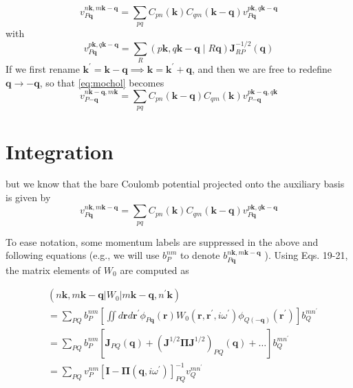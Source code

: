 \documentclass[12pt]{article}
\begin{document}
\begin{equation}
    v_{P\mathbf{q}}^{n \mathbf{k}, m \mathbf{k}-\mathbf{q}} = \sum_{pq} C_{pn}(\mathbf{k}) C_{qm}(\mathbf{k}-\mathbf{q}) v_{P\mathbf{q}}^{p\mathbf{k}, q\mathbf{k}-\mathbf{q}}
\label{eq:mochol}
\end{equation}
with
\begin{equation}
    v_{P\mathbf{q}}^{p\mathbf{k}, q\mathbf{k}-\mathbf{q}} = \sum_R (p\mathbf{k}, q\mathbf{k}-\mathbf{q} \mid R\mathbf{q}) \mathbf{J}_{RP}^{-1/2}(\mathbf{q})
\end{equation}
If we first rename $\mathbf{k^\prime} = \mathbf{k}-\mathbf{q} \implies \mathbf{k} = \mathbf{k^\prime} + \mathbf{q}$, and then we are free to redefine $\mathbf{q} \rightarrow -\mathbf{q}$, so that \ref{eq:mochol} becomes
\begin{equation}
    v_{P\mathbf{-q}}^{n \mathbf{k}-\mathbf{q}, m \mathbf{k}} = \sum_{pq} C_{pn}(\mathbf{k}-\mathbf{q}) C_{qm}(\mathbf{k}) v_{P\mathbf{-q}}^{p\mathbf{k}-\mathbf{q}, q\mathbf{k}}
\end{equation}
\section{Integration}
but we know that the bare Coulomb potential projected onto the auxiliary basis is given by
\begin{equation}
    v_{P\mathbf{q}}^{n\mathbf{k}, m\mathbf{k}-\mathbf{q}} = \sum_{pq} C_{pn}(\mathbf{k}) C_{qm}(\mathbf{k}-\mathbf{q}) v_{P\mathbf{q}}^{p\mathbf{k}, q\mathbf{k}-\mathbf{q}}
\end{equation}

To ease notation, some momentum labels are suppressed in the above and following equations (e.g., we will use $b_{P}^{n m}$ to denote $b_{P \mathbf{q}}^{n \mathbf{k}, m \mathbf{k}-\mathbf{q}}$ ). Using Eqs. 19-21, the matrix elements of $W_{0}$ are computed as

\begin{align*}
& \left(n \mathbf{k}, m \mathbf{k}-\mathbf{q}\left|W_{0}\right| m \mathbf{k}-\mathbf{q}, n^{\prime} \mathbf{k}\right) \\
& =\sum_{P Q} b_{P}^{n m}\left[\iint d \mathbf{r} d \mathbf{r}^{\prime} \phi_{P \mathbf{q}}(\mathbf{r}) W_{0}\left(\mathbf{r}, \mathbf{r}^{\prime}, i \omega^{\prime}\right) \phi_{Q(-\mathbf{q})}\left(\mathbf{r}^{\prime}\right)\right] b_{Q}^{m n^{\prime}} \\
& =\sum_{P Q} b_{P}^{n m}\left[\mathbf{J}_{P Q}(\mathbf{q})+\left(\mathbf{J}^{1 / 2} \boldsymbol{\Pi} \mathbf{J}^{1 / 2}\right)_{P Q}(\mathbf{q})+\ldots\right] b_{Q}^{m n^{\prime}}  \tag{22}\\
& =\sum_{P Q} v_{P}^{n m}\left[\mathbf{I}-\mathbf{\Pi}\left(\mathbf{q}, i \omega^{\prime}\right)\right]_{P Q}^{-1} v_{Q}^{m n^{\prime}}
\end{align*}
\end{document}
